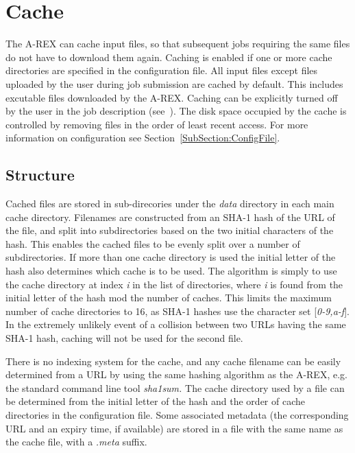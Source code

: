 \documentclass{article}                            %
\begin{document}
\section{Cache\label{sec:cache}}

The A-REX can cache input files, so that subsequent jobs requiring the
same files do not have to download them again. Caching is enabled if
one or more cache directories are specified in the configuration
file. All input files except files uploaded by the user during job
submission are cached by default. This includes excutable files
downloaded by the A-REX. Caching can be explicitly turned off by the
user in the job description (see~\cite{userguide1}). The disk space
occupied by the cache is controlled by removing files in the order of
least recent access. For more information on configuration see
Section~\ref{SubSection:ConfigFile}.

\subsection{Structure}

Cached files are stored in sub-direcories under the \emph{data} directory
in each main cache directory. Filenames are constructed from an SHA-1
hash of the URL of the file, and split into subdirectories based on
the two initial characters of the hash. This enables the cached files
to be evenly split over a number of subdirectories. If
more than one cache directory is used the initial letter of the hash
also determines which cache is to be used. The algorithm is simply
to use the cache directory at index \emph{i} in the list of directories,
where \emph{i} is found from the initial letter of the hash mod the
number of caches. This limits the maximum number of cache directories
to 16, as SHA-1 hashes use the character set {[}\emph{0-9,a-f}]. In
the extremely unlikely event of a collision between two URLs having
the same SHA-1 hash, caching will not be used for the second file.

There is no indexing system for the cache, and any cache filename
can be easily determined from a URL by using the same hashing algorithm
as the A-REX, e.g. the standard command line tool \emph{sha1sum. }The
cache directory used by a file can be determined from the initial
letter of the hash and the order of cache directories in the configuration
file. Some associated metadata (the corresponding URL and an expiry
time, if available) are stored in a file with the same name as the
cache file, with a \emph{.meta} suffix.
\end{document}
